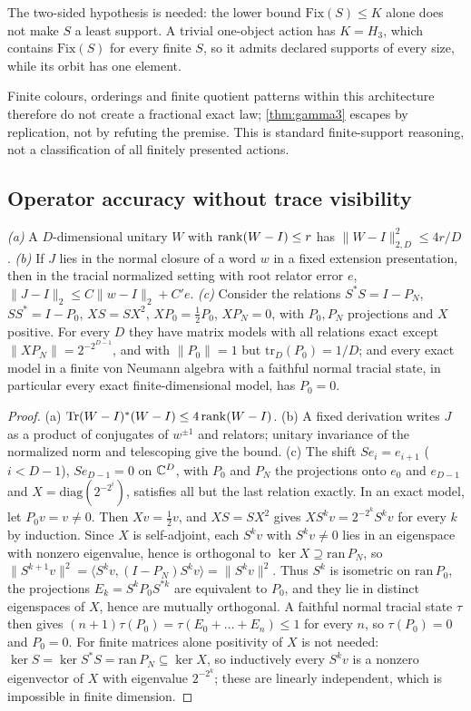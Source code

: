 The two-sided hypothesis is needed: the lower bound $\mathrm{Fix}(S)\le K$ alone does not make $S$ a least support. A trivial
one-object action has $K=H_3$, which contains $\mathrm{Fix}(S)$ for every finite $S$, so it admits declared supports of every size,
while its orbit has one element.

Finite colours, orderings and finite quotient patterns within this architecture therefore do not create a fractional exact law;
\cref{thm:gamma3} escapes by replication, not by refuting the premise. This is standard finite-support reasoning, not a
classification of all finitely presented actions.

\subsection{Operator accuracy without trace visibility}\label{sec:trace-visibility}

\begin{proposition}\label{prop:invisible}
\emph{(a)} A $D$-dimensional unitary $W$ with $\operatorname{rank}(W-I)\le r$ has $\|W-I\|_{2,D}^2\le4r/D$. \emph{(b)} If $J$ lies in the normal closure
of a word $w$ in a fixed extension presentation, then in the tracial normalized setting with root relator error $e$,
$\|J-I\|_2\le C\|w-I\|_2+C'e$. \emph{(c)} Consider the relations $S^*S=I-P_N$, $SS^*=I-P_0$, $XS=SX^2$, $XP_0=\frac12P_0$, $XP_N=0$,
with $P_0,P_N$ projections and $X$ positive. For every $D$ they have matrix models with all relations exact except
$\|XP_N\|=2^{-2^{D-1}}$, and with $\|P_0\|=1$ but $\mathrm{tr}_D(P_0)=1/D$; and every exact model in a finite von Neumann algebra with a
faithful normal tracial state, in particular every exact finite-dimensional model, has $P_0=0$.
\end{proposition}

\begin{proof}
(a) $\operatorname{Tr}(W-I)^*(W-I)\le4\operatorname{rank}(W-I)$. (b) A fixed derivation writes $J$ as a product of conjugates of $w^{\pm1}$ and relators; unitary
invariance of the normalized norm and telescoping give the bound. (c) The shift $Se_i=e_{i+1}$ ($i<D-1$), $Se_{D-1}=0$ on $\mathbb C^D$, with
$P_0$ and $P_N$ the projections onto $e_0$ and $e_{D-1}$ and $X=\mathrm{diag}(2^{-2^i})$, satisfies all but the last relation exactly. In an
exact model, let $P_0v=v\ne0$. Then $Xv=\frac12v$, and $XS=SX^2$ gives $XS^kv=2^{-2^k}S^kv$ for every $k$ by induction. Since $X$ is
self-adjoint, each $S^kv$ with $S^kv\ne0$ lies in an eigenspace with nonzero eigenvalue, hence is orthogonal to $\ker X\supseteq\mathrm{ran}\,P_N$,
so $\|S^{k+1}v\|^2=\langle S^kv,(I-P_N)S^kv\rangle=\|S^kv\|^2$. Thus $S^k$ is isometric on $\mathrm{ran}\,P_0$, the projections
$E_k=S^kP_0S^{*k}$ are equivalent to $P_0$, and they lie in distinct eigenspaces of $X$, hence are mutually orthogonal. A faithful normal
tracial state $\tau$ then gives $(n+1)\tau(P_0)=\tau(E_0+\dots+E_n)\le1$ for every $n$, so $\tau(P_0)=0$ and $P_0=0$. For finite matrices
alone positivity of $X$ is not needed: $\ker S=\ker S^*S=\mathrm{ran}\,P_N\subseteq\ker X$, so inductively every $S^kv$ is a nonzero
eigenvector of $X$ with eigenvalue $2^{-2^k}$; these are linearly independent, which is impossible in finite dimension.
\end{proof}

